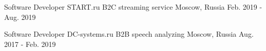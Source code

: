 \begin{cventries}
  \cventry
    {Software Developer} %
    {} %
    {START.ru} %
    {B2C streaming service} %
    {Moscow, Russia} %
    {Feb. 2019 - Aug. 2019} %
    {}

  \cventry
    {Software Developer} %
    {} %
    {DC-systems.ru} %
    {B2B speech analyzing} %
    {Moscow, Russia} %
    {Aug. 2017 - Feb. 2019} %
    {}

\end{cventries}

